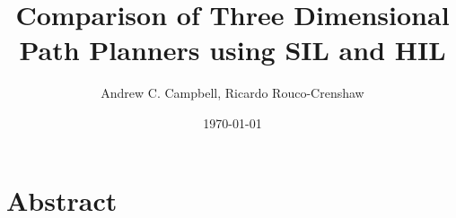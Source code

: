 \documentclass{aiaa-tc}
\title{Comparison of Three Dimensional Path Planners using SIL and HIL}
\author{Andrew C. Campbell, Ricardo Rouco-Crenshaw}
\date{\today}
\begin{document}
\maketitle

\section[c]{Abstract}
\end{document}
